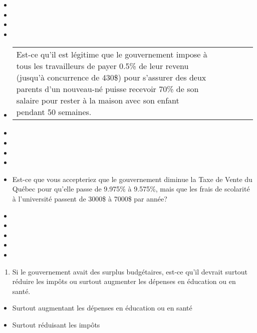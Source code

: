 \documentclass[
  letterpaper,
  DIV=11,
  numbers=noendperiod]{scrreprt}
\providecommand{\tightlist}{%
  \setlength{\itemsep}{0pt}\setlength{\parskip}{0pt}}\usepackage{longtable,booktabs,array}
\begin{document}
\begin{itemize}
\item
\item
\item
\item
\item
  \begin{longtable}[]{@{}
    >{\raggedright\arraybackslash}p{}
    >{\raggedright\arraybackslash}p{}
    >{\raggedright\arraybackslash}p{}
    >{\raggedright\arraybackslash}p{}
    >{\raggedright\arraybackslash}p{}
    >{\raggedright\arraybackslash}p{}@{}}
  \toprule\noalign{}
  \endhead
  \bottomrule\noalign{}
  \endlastfoot
  Est-ce qu'il est légitime que le gouvernement impose à tous les
  travailleurs de payer 0.5\% de leur revenu (jusqu'à concurrence de
  430\$) pour s'assurer des deux parents d'un nouveau-né puisse recevoir
  70\% de son salaire pour rester à la maison avec son enfant pendant 50
  semaines. & & & & & \\
  \end{longtable}
\item
\item
\item
\item
\item
  \hfill\break
  Est-ce que vous accepteriez que le gouvernement diminue la Taxe de
  Vente du Québec pour qu'elle passe de 9.975\% à 9.575\%, mais que les
  frais de scolarité à l'université passent de 3000\$ à 7000\$ par
  année? \textbar{}
\item
\item
\item
\item
\item
\end{itemize}

\begin{enumerate}
\def\labelenumi{\arabic{enumi}.}
\setcounter{enumi}{24}
\tightlist
\item
  Si le gouvernement avait des surplus budgétaires, est-ce qu'il devrait
  surtout réduire les impôts ou surtout augmenter les dépenses en
  éducation ou en santé.
\end{enumerate}

\begin{itemize}
\tightlist
\item
  Surtout augmentant les dépenses en éducation ou en santé
\item
  Surtout réduisant les impôts
\end{itemize}
\end{document}
